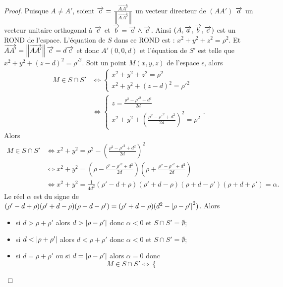 \begin{proof}
  Puisque \(A \neq A'\), soient \(\overrightarrow{c} =
  \frac{\overrightarrow{AA'}}{\left\lVert\overrightarrow{AA'}\right\rVert}\) un vecteur directeur de \((AA')\)
  \(\overrightarrow{a}\) un vecteur unitaire orthogonal à \(\overrightarrow{c}\) et \(\overrightarrow{b} =
  \overrightarrow{a}\wedge\overrightarrow{c}\).  Ainsi \((A, \overrightarrow{a}, \overrightarrow{b}, \overrightarrow{c})\) est un ROND de l'espace.
  L'équation de \(S\) dans ce ROND est : \(x^2 + y^2 + z^2 = \rho^2\). Et
  \(\overrightarrow{AA'} = \left\lVert\overrightarrow{AA'}\right\rVert\overrightarrow{c} = d\overrightarrow{c}\) et donc \(A'(0, 0, d)\) et
  l'équation de \(S'\) est telle que \(x^2 + y^2 + (z - d)^2 = \rho'^2\).
  Soit un point \(M(x, y, z)\) de l'espace \(\epsilon\), alors
  \begin{align}
    M \in S\cap S'
    & \iff
    \begin{cases}
      x^2 + y^2 + z^2 = \rho^2 \\
      x^2 + y^2 + (z - d)^2 = \rho'^2
    \end{cases} \\
    & \iff
    \begin{cases}
      z = \frac{\rho^2 - \rho'^2 + d^2}{2d}\\
      x^2 + y^2 + \left(\frac{\rho^2 - \rho'^2 + d^2}{2d}\right)^2 = \rho^2
    \end{cases}.
  \end{align}
  Alors
  \begin{align}
    M \in S\cap S'
    &\iff x^2 + y^2 = \rho^2 - \left(\frac{\rho^2 - \rho'^2 +
    d^2}{2d}\right)^2\\
    &\iff x^2 + y^2 = \left(\rho - \frac{\rho^2 - \rho'^2 +
    d^2}{2d}\right)\left(\rho + \frac{\rho^2 - \rho'^2 + d^2}{2d}\right)\\
    &\iff x^2 + y^2 = \frac{1}{4d^2}(\rho'-d + \rho)(\rho' + d - \rho)(\rho + d
    - \rho')(\rho + d + \rho') = \alpha.
  \end{align}
  Le réel \(\alpha\) est du signe de \((\rho'-d + \rho)(\rho' + d -
  \rho)(\rho + d - \rho') = (\rho' + d - \rho)(d^2 - \left\lvert\rho -
  \rho'\right\rvert^2)\).  Alors
  \begin{itemize}
    \item si \(d>\rho + \rho'\) alors \(d>\left\lvert\rho - \rho'\right\rvert\) donc
      \(\alpha<0\) et \(S\cap S' = \emptyset\);
    \item si \(d<\left\lvert\rho + \rho'\right\rvert\) alors \(d<\rho + \rho'\) donc
      \(\alpha<0\) et \(S\cap S' = \emptyset\);
    \item si \(d = \rho + \rho'\) ou si \(d = \left\lvert\rho - \rho'\right\rvert\) alors
      \(\alpha = 0\) donc
      \begin{equation}
        M\in S\cap S' \iff \begin{cases}

\end{cases}
\end{equation}
\end{itemize}
\end{proof}
